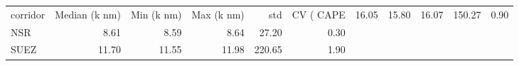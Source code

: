 \begin{tabular}{lrrrrr}
\toprule
corridor &  Median (k nm) &  Min (k nm) &  Max (k nm) &    std &  CV (%
\midrule
    CAPE &          16.05 &       15.80 &       16.07 & 150.27 &    0.90 \\
     NSR &           8.61 &        8.59 &        8.64 &  27.20 &    0.30 \\
    SUEZ &          11.70 &       11.55 &       11.98 & 220.65 &    1.90 \\
\bottomrule
\end{tabular}
